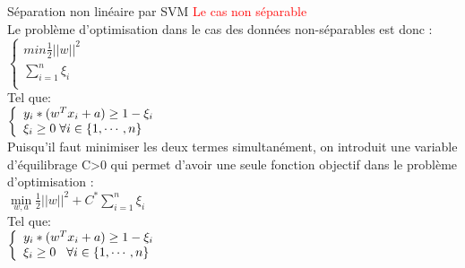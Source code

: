 \documentclass{bredelebeamer}
\begin{document}
\begin{frame}{Séparation non linéaire par SVM}
\textcolor{red}{Le cas non séparable}\vspace{1\baselineskip}\\
Le problème d’optimisation dans le cas des données non-séparables est donc :\\ 
$\left\{ \begin{array}{l}
min \frac{1}{2} ||w||^2\\
\sum\limits_{i=1}^{n} \xi_i\\
\end{array}\right.$\\
Tel que:\\
$\left\{ \begin{array}{l}
y_i*(w^{T}x_i+a)  \geq 1-\xi_i\\
\xi_i \geq 0 \hspace*{0.1 cm} \forall i \in \{1, \cdots, n\}\\
\end{array}\right.$ \vspace{1\baselineskip}\\
Puisqu’il faut minimiser les deux termes simultanément, on introduit une variable d’équilibrage C>0 qui permet d’avoir une seule fonction objectif dans le problème d’optimisation : \\
$\min\limits_{w,a}\frac{1}{2} ||w||^2+ C^{*}\sum\limits_{i=1}^{n} \xi_i$\\
 Tel que:\\
$\left\{ \begin{array}{l}
y_i*(w^{T}x_i+a)\geq  1 -\xi_i\\
\xi_i \geq 0 \hspace*{0.3 cm} \forall i \in \{1, \cdots, n\}\\
\end{array}\right.$\\
\end{frame}
\end{document}
